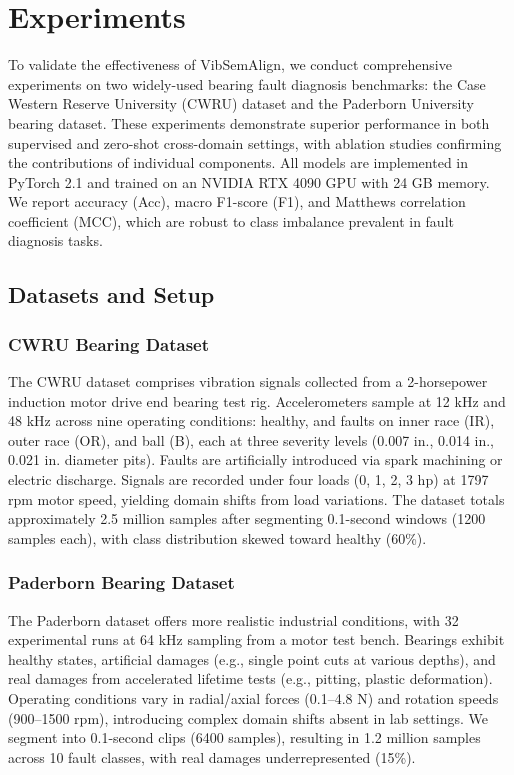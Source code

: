 \section{Experiments}

To validate the effectiveness of VibSemAlign, we conduct comprehensive experiments on two widely-used bearing fault diagnosis benchmarks: the Case Western Reserve University (CWRU) dataset and the Paderborn University bearing dataset. These experiments demonstrate superior performance in both supervised and zero-shot cross-domain settings, with ablation studies confirming the contributions of individual components. All models are implemented in PyTorch 2.1 and trained on an NVIDIA RTX 4090 GPU with 24 GB memory. We report accuracy (Acc), macro F1-score (F1), and Matthews correlation coefficient (MCC), which are robust to class imbalance prevalent in fault diagnosis tasks.

\subsection{Datasets and Setup}

\subsubsection{CWRU Bearing Dataset}
The CWRU dataset \cite{casewestern2010} comprises vibration signals collected from a 2-horsepower induction motor drive end bearing test rig. Accelerometers sample at 12 kHz and 48 kHz across nine operating conditions: healthy, and faults on inner race (IR), outer race (OR), and ball (B), each at three severity levels (0.007 in., 0.014 in., 0.021 in. diameter pits). Faults are artificially introduced via spark machining or electric discharge. Signals are recorded under four loads (0, 1, 2, 3 hp) at 1797 rpm motor speed, yielding domain shifts from load variations. The dataset totals approximately 2.5 million samples after segmenting 0.1-second windows (1200 samples each), with class distribution skewed toward healthy (60\%).

\subsubsection{Paderborn Bearing Dataset}
The Paderborn dataset \cite{paderborn2014} offers more realistic industrial conditions, with 32 experimental runs at 64 kHz sampling from a motor test bench. Bearings exhibit healthy states, artificial damages (e.g., single point cuts at various depths), and real damages from accelerated lifetime tests (e.g., pitting, plastic deformation). Operating conditions vary in radial/axial forces (0.1--4.8 N) and rotation speeds (900--1500 rpm), introducing complex domain shifts absent in lab settings. We segment into 0.1-second clips (6400 samples), resulting in 1.2 million samples across 10 fault classes, with real damages underrepresented (15\%).


